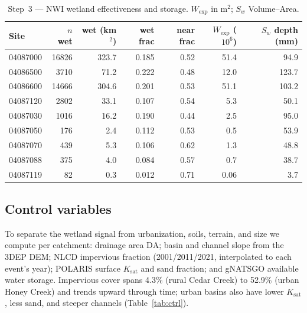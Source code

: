 \documentclass[11pt]{article}
\begin{document}
\begin{table}[htbp]\centering
\caption{Step~3 --- NWI wetland effectiveness and storage. $W_{\exp}$ in m$^2$; $S_w$ Volume--Area.}
\label{tab:wsw}
\small
\begin{tabular}{lrrrrrr}
\toprule
Site & $n$ wet & wet (km$^2$) & wet frac & near frac & $W_{\exp}$ ($10^6$) & $S_w$ depth (mm) \\
\midrule
04087000 & 16826 & 323.7 & 0.185 & 0.52 & 51.4 & 94.9 \\
04086500 & 3710  & 71.2  & 0.222 & 0.48 & 12.0 & 123.7 \\
04086600 & 14666 & 304.6 & 0.201 & 0.53 & 51.1 & 103.2 \\
04087120 & 2802  & 33.1  & 0.107 & 0.54 & 5.3  & 50.1 \\
04087030 & 1016  & 16.2  & 0.190 & 0.44 & 2.5  & 95.0 \\
04087050 & 176   & 2.4   & 0.112 & 0.53 & 0.5  & 53.9 \\
04087070 & 439   & 5.3   & 0.106 & 0.62 & 1.3  & 48.8 \\
04087088 & 375   & 4.0   & 0.084 & 0.57 & 0.7  & 38.7 \\
04087119 & 82    & 0.3   & 0.012 & 0.71 & 0.06 & 3.7 \\
\bottomrule
\end{tabular}
\end{table}

\subsection{Control variables}
To separate the wetland signal from urbanization, soils, terrain, and size we compute per
catchment: drainage area $\mathrm{DA}$; basin and channel slope from the 3DEP DEM; NLCD
impervious fraction (2001/2011/2021, interpolated to each event's year); POLARIS surface
$K_{\text{sat}}$ and sand fraction; and gNATSGO available water storage. Impervious cover
spans 4.3\% (rural Cedar Creek) to 52.9\% (urban Honey Creek) and trends upward through time;
urban basins also have lower $K_{\text{sat}}$, less sand, and steeper channels
(Table~\ref{tab:ctrl}).
\end{document}
